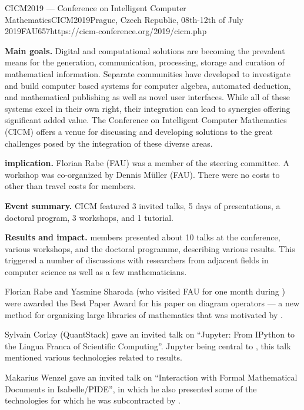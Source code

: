 \begin{event}{CICM2019 --- Conference on Intelligent Computer Mathematics}{CICM2019}{Prague, Czech Republic, 08th-12th of July 2019}{FAU}{65}{7}{https://cicm-conference.org/2019/cicm.php}

\textbf{Main goals.}
Digital and computational solutions are becoming the prevalent means for the generation, communication, processing, storage and curation of mathematical information.
Separate communities have developed to investigate and build computer based systems for computer algebra, automated deduction, and mathematical publishing as well as novel user interfaces.
While all of these systems excel in their own right, their integration can lead to synergies offering significant added value.
The Conference on Intelligent Computer Mathematics (CICM) offers a venue for discussing and developing solutions to the great challenges posed by the integration of these diverse areas.

\textbf{\ODK implication.}
Florian Rabe (FAU) was a member of the steering committee.
A workshop was co-organized by Dennis M\"uller (FAU).
There were no costs to \ODK other than travel costs for \ODK members.

\textbf{Event summary.}
CICM featured 3 invited talks, 5 days of presentations, a doctoral program, 3 workshops, and 1 tutorial.

\textbf{Results and impact.}
\ODK members presented about 10 talks at the conference, various workshops, and the doctoral programme, describing various \ODK results.
This triggered a number of discussions with researchers from adjacent fields in computer science as well as a few mathematicians.

Florian Rabe and Yasmine Sharoda (who visited FAU for one month during \ODK) were awarded the Best Paper Award for his paper on diagram operators --- a new method for organizing large libraries of mathematics that was motivated by \ODK.

Sylvain Corlay (QuantStack) gave an invited talk on ``Jupyter: From IPython to the Lingua Franca of Scientific Computing''.
Jupyter being central to \ODK, this talk mentioned various technologies related to \ODK results.

Makarius Wenzel gave an invited talk on ``Interaction with Formal Mathematical Documents in Isabelle/PIDE'', in which he also presented some of the technologies for which he was subcontracted by \ODK.
\end{event}

